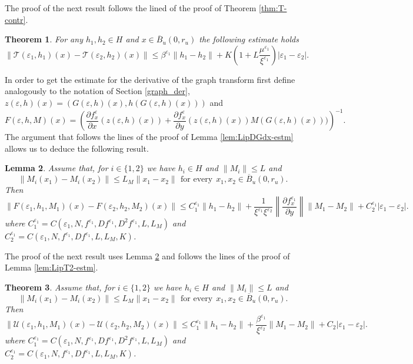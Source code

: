 \documentclass[11pt, leqno]{amsart}
\newtheorem{thm}{Theorem}[section]
\newtheorem{lem}[thm]{Lemma}
\theoremstyle{definition}
\begin{document}
The proof of the next result follows the lined of the proof of Theorem \ref{thm:T-contr}.
\begin{thm}
	\label{thm:T-contr_e}
For any $h_1,h_2 \in H$ and $x \in \overline{B}_u(0,r_u)$ the following estimate holds
	\begin{equation}
		\| \mathcal{T}(\varepsilon_1,h_1)(x) - \mathcal{T}(\varepsilon_2,h_2)(x) \| \leq \beta^{\varepsilon_1} \|h_1 - h_2\| + K\left(1+L\frac{\mu^{\varepsilon_1}}{\xi^{\varepsilon_1}}\right)|\varepsilon_1-\varepsilon_2|.
	\end{equation}
\end{thm}
In order to get the estimate for the derivative of the graph transform first define analogously to the notation of Section \ref{graph_der},
$z(\varepsilon,h)(x) = (G(\varepsilon,h)(x),h(G(\varepsilon,h)(x)))$ and $$
F(\varepsilon,h,M)(x) = \left(\frac{\partial f^\varepsilon_x}{\partial x}(z(\varepsilon,h)(x)) + \frac{\partial f^\varepsilon_x}{\partial y}(z(\varepsilon,h)(x)) M(G(\varepsilon,h)(x))) \right) ^{-1}.
$$
The argument that follows the lines of the proof of Lemma \ref{lem:LipDGdx-estm} allows us to deduce the following result.
\begin{lem}
	\label{lem:LipDGdx-estm_e}
 Assume that, for $i\in \{1,2\}$ we have $h_i
	\in H$ and $\|M_i\| \leq L$ and
	\begin{equation}
		\|M_i(x_1) - M_i(x_2)\| \leq L_M \|x_1-x_2\|\, \ \textrm{for every}\ \ x_1,x_2\in \overline{B}_u(0,r_u).
	\end{equation}
	Then
	\begin{equation}
		\left\|F(\varepsilon_1,h_1,M_1)(x)- F(\varepsilon_2,h_2,M_2)(x)\right\| \leq  C_1^{\varepsilon_1} \|h_1-h_2\| + \frac{1}{\xi^{\varepsilon_1}\xi^{\varepsilon_2}}\left\|\frac{\partial f^{\varepsilon_1}_x}{\partial y}\right\|\|M_1-M_2\| + C_2^{\varepsilon_1}|\varepsilon_1-\varepsilon_2|.
	\end{equation}
	where  $C_1^{\varepsilon_1}=C(\varepsilon_1,N,f^{\varepsilon_1},Df^{\varepsilon_1},D^2f^{\varepsilon_1},L, L_M)$ and $C_2^{\varepsilon_1}=C(\varepsilon_1,N,f^{\varepsilon_1},Df^{\varepsilon_1},L, L_M,K)$.
\end{lem}
The proof of the next result uses Lemma \ref{lem:LipDGdx-estm_e} and  follows the lines of the proof of Lemma \ref{lem:LipT2-estm}.
\begin{thm}
	\label{lem:LipT2-estm_e}
Assume that, for $i\in \{1,2\}$ we have $h_i
	\in H$ and $\|M_i\| \leq L$ and
	\begin{equation}
		\|M_i(x_1) - M_i(x_2)\| \leq L_M \|x_1-x_2\|\, \ \textrm{for every}\ \ x_1,x_2\in \overline{B}_u(0,r_u).
	\end{equation}
	Then
	\begin{equation}
		\left\|\mathcal{U}(\varepsilon_1,h_1,M_1)(x)- \mathcal{U}(\varepsilon_2,h_2,M_2)(x)\right\| \leq   C_1^{\varepsilon_1}\|h_1-h_2\|+\frac{\beta^{\varepsilon_1}}{\xi^{\varepsilon_2}}\|M_1-M_2\|+C_2|\varepsilon_1-\varepsilon_2|.
	\end{equation}
	where $C_1^{\varepsilon_1}=C(\varepsilon_1,N,f^{\varepsilon_1},Df^{\varepsilon_1},D^2f^{\varepsilon_1},L,L_M)$ and $C_2^{\varepsilon_1}=C(\varepsilon_1,N,f^{\varepsilon_1},Df^{\varepsilon_1},L,L_M,K)$.
	\end{thm}
\end{document}
